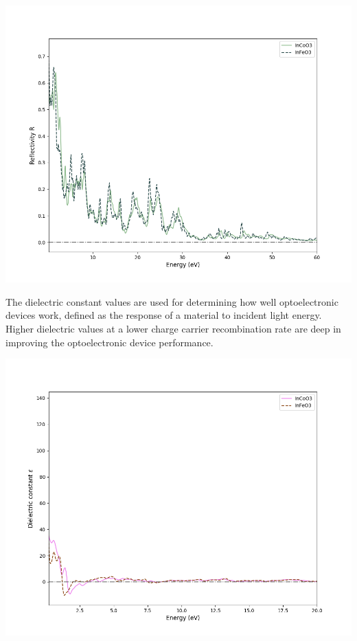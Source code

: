 \documentclass[12pt, letterpaper]{article}
\newcommand*{\1}{\hspace{1pt}}
\begin{document}
    \begin{adjustbox}{center,caption={Reflectivity Of InCoO3 and InFeO3},label={somelabel},nofloat=figure,vspace=\bigskipamount,}
        \includegraphics[width=\textwidth]{refleceng}
    \end{adjustbox}
    
    The dielectric constant values are used for determining how well optoelectronic devices work, defined as the response of a material to incident light energy. Higher dielectric values at a lower 
    charge carrier recombination rate are deep in improving the optoelectronic device performance. 

    \begin{adjustbox}{center, caption={Dielectric constants of InCoO3 and InFeO3(Real)},label={somelabel},nofloat=figure,}
        \includegraphics[width=\textwidth]{dieleceng}
    \end{adjustbox}
\end{document}
